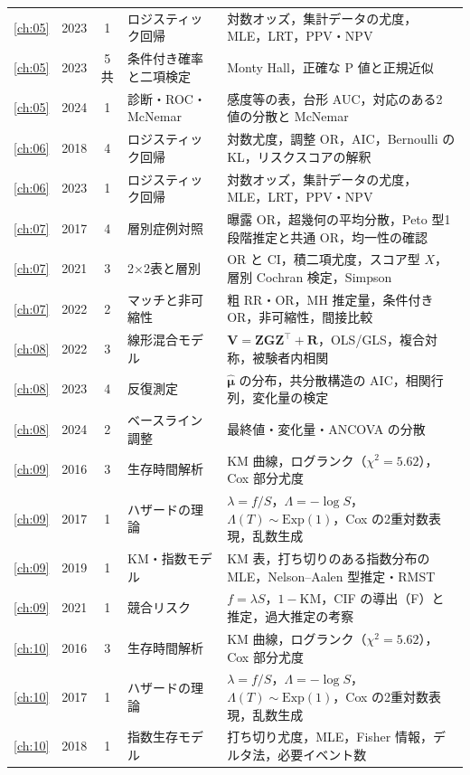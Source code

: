 \documentclass[a4paper,11pt,openany]{ltjsbook}
\newcommand{\Ex}{\mathrm{Exp}}
\newcommand{\transp}{^{\top}}
\begin{document}
\begin{center}
\begin{longtable}{@{}cccL{36mm}L{78mm}@{}}
\ref{ch:05} & 2023 & 1 & ロジスティック回帰 & 対数オッズ，集計データの尤度，MLE，LRT，PPV・NPV\\
\ref{ch:05} & 2023 & 5共 & 条件付き確率と二項検定 & Monty Hall，正確な P 値と正規近似\\
\ref{ch:05} & 2024 & 1 & 診断・ROC・McNemar & 感度等の表，台形 AUC，対応のある2 値の分散と McNemar\\
\midrule
\ref{ch:06} & 2018 & 4 & ロジスティック回帰 & 対数尤度，調整 OR，AIC，Bernoulli の KL，リスクスコアの解釈\\
\ref{ch:06} & 2023 & 1 & ロジスティック回帰 & 対数オッズ，集計データの尤度，MLE，LRT，PPV・NPV\\
\midrule
\ref{ch:07} & 2017 & 4 & 層別症例対照 & 曝露 OR，超幾何の平均分散，Peto 型1段階推定と共通 OR，均一性の確認\\
\ref{ch:07} & 2021 & 3 & 2×2表と層別 & OR と CI，積二項尤度，スコア型 $X$，層別 Cochran 検定，Simpson\\
\ref{ch:07} & 2022 & 2 & マッチと非可縮性 & 粗 RR・OR，MH 推定量，条件付き OR，非可縮性，間接比較\\
\midrule
\ref{ch:08} & 2022 & 3 & 線形混合モデル & $\bm V=\bm Z\bm G\bm Z\transp+\bm R$，OLS/GLS，複合対称，被験者内相関\\
\ref{ch:08} & 2023 & 4 & 反復測定 & $\hat{\bm\mu}$ の分布，共分散構造の AIC，相関行列，変化量の検定\\
\ref{ch:08} & 2024 & 2 & ベースライン調整 & 最終値・変化量・ANCOVA の分散\\
\midrule
\ref{ch:09} & 2016 & 3 & 生存時間解析 & KM 曲線，ログランク（$\chi^2=5.62$），Cox 部分尤度\\
\ref{ch:09} & 2017 & 1 & ハザードの理論 & $\lambda=f/S$，$\Lambda=-\log S$，$\Lambda(T)\sim\Ex(1)$，Cox の2重対数表現，乱数生成\\
\ref{ch:09} & 2019 & 1 & KM・指数モデル & KM 表，打ち切りのある指数分布の MLE，Nelson--Aalen 型推定・RMST\\
\ref{ch:09} & 2021 & 1 & 競合リスク & $f=\lambda S$，$1-$KM，CIF の導出（F）と推定，過大推定の考察\\
\midrule
\ref{ch:10} & 2016 & 3 & 生存時間解析 & KM 曲線，ログランク（$\chi^2=5.62$），Cox 部分尤度\\
\ref{ch:10} & 2017 & 1 & ハザードの理論 & $\lambda=f/S$，$\Lambda=-\log S$，$\Lambda(T)\sim\Ex(1)$，Cox の2重対数表現，乱数生成\\
\ref{ch:10} & 2018 & 1 & 指数生存モデル & 打ち切り尤度，MLE，Fisher 情報，デルタ法，必要イベント数\\

\end{longtable}
\end{center}
\end{document}
